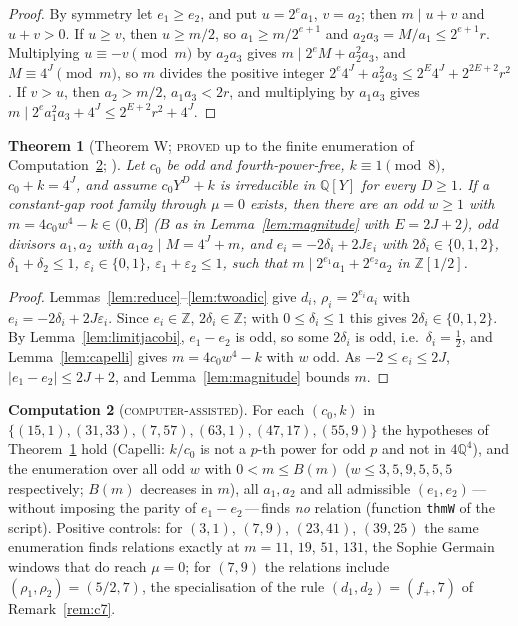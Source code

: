 \documentclass[11pt,reqno]{amsart}
\newtheorem{theorem}{Theorem}[section]
\theoremstyle{definition}
\newtheorem{computation}[theorem]{Computation}
\newcommand{\Z}{\mathbb Z}
\newcommand{\Q}{\mathbb Q}
\newcommand{\status}[1]{\textup{\textsc{#1}}}
\begin{document}
\begin{proof}
By symmetry let $e_1\ge e_2$, and put $u=2^ea_1$, $v=a_2$; then $m\mid u+v$
and $u+v>0$.  If $u\ge v$, then $u\ge m/2$, so $a_1\ge m/2^{e+1}$ and
$a_2a_3=M/a_1\le2^{e+1}r$.  Multiplying $u\equiv-v\pmod m$ by $a_2a_3$ gives
$m\mid2^eM+a_2^2a_3$, and $M\equiv4^J\pmod m$, so $m$ divides the positive
integer $2^e4^J+a_2^2a_3\le2^E4^J+2^{2E+2}r^2$.  If $v>u$, then $a_2>m/2$,
$a_1a_3<2r$, and multiplying by $a_1a_3$ gives $m\mid2^ea_1^2a_3+4^J\le
2^{E+2}r^2+4^J$.
\end{proof}

\begin{theorem}[Theorem W; \status{proved} up to the finite enumeration of Computation~\ref{comp:W}; {\cite[Thm.~W]{ExpOpen}}]\label{thm:W}
Let $c_0$ be odd and fourth-power-free, $k\equiv1\pmod8$, $c_0+k=4^J$, and
assume $c_0Y^D+k$ is irreducible in $\Q[Y]$ for every $D\ge1$.  If a
constant-gap root family through $\mu=0$ exists, then there are an odd
$w\ge1$ with $m=4c_0w^4-k\in(0,B]$ \textup{(}$B$ as in
Lemma~\ref{lem:magnitude} with $E=2J+2$\textup{)}, odd divisors $a_1,a_2$ with
$a_1a_2\mid M=4^J+m$, and $e_i=-2\delta_i+2J\varepsilon_i$ with
$2\delta_i\in\{0,1,2\}$, $\delta_1+\delta_2\le1$, $\varepsilon_i\in\{0,1\}$,
$\varepsilon_1+\varepsilon_2\le1$, such that $m\mid2^{e_1}a_1+2^{e_2}a_2$ in
$\Z[1/2]$.
\end{theorem}

\begin{proof}
Lemmas~\ref{lem:reduce}--\ref{lem:twoadic} give $d_i$, $\rho_i=2^{e_i}a_i$ with
$e_i=-2\delta_i+2J\varepsilon_i$.  Since $e_i\in\Z$, $2\delta_i\in\Z$; with
$0\le\delta_i\le1$ this gives $2\delta_i\in\{0,1,2\}$.  By
Lemma~\ref{lem:limitjacobi}, $e_1-e_2$ is odd, so some $2\delta_i$ is odd,
i.e.\ $\delta_i=\frac12$, and Lemma~\ref{lem:capelli} gives $m=4c_0w^4-k$
with $w$ odd.  As $-2\le e_i\le2J$, $|e_1-e_2|\le2J+2$, and
Lemma~\ref{lem:magnitude} bounds $m$.
\end{proof}

\begin{computation}[\status{computer-assisted}]\label{comp:W}
For each $(c_0,k)$ in
$\{(15,1),(31,33),(7,57),(63,1),(47,17),(55,9)\}$ the hypotheses of
Theorem~\ref{thm:W} hold (Capelli: $k/c_0$ is not a $p$-th
power for odd $p$ and not in $4\Q^4$), and the enumeration over all odd $w$
with $0<m\le B(m)$ ($w\le3,5,9,5,5,5$ respectively; $B(m)$ decreases in
$m$), all $a_1,a_2$ and all admissible $(e_1,e_2)$\,---\,without imposing the
parity of $e_1-e_2$\,---\,finds \emph{no} relation (function \texttt{thmW} of
the script).  Positive controls: for
$(3,1)$, $(7,9)$, $(23,41)$, $(39,25)$ the same enumeration finds relations
exactly at $m=11$, $19$, $51$, $131$, the Sophie Germain windows that do
reach $\mu=0$; for $(7,9)$ the relations include $(\rho_1,\rho_2)=(5/2,7)$,
the specialisation of the rule $(d_1,d_2)=(f_+,7)$ of Remark~\ref{rem:c7}.
\end{computation}
\end{document}
